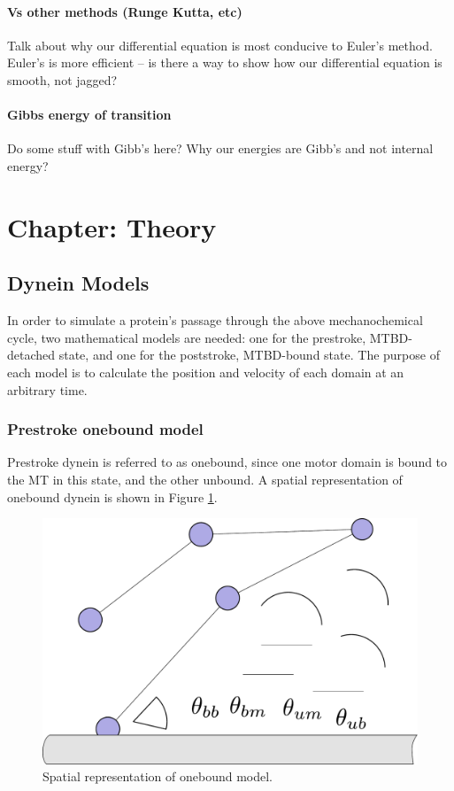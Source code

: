 \documentclass[10pt]{article} %
\begin{document}
\paragraph{Vs other methods (Runge Kutta, etc)}
Talk about why our differential equation is most conducive to Euler's method. Euler's is more
efficient -- is there a way to show how our differential equation is smooth, not jagged?

\paragraph{Gibbs energy of transition}
Do some stuff with Gibb's here? Why our energies are Gibb's and not internal energy?\\

\section{Chapter: Theory}
\subsection{Dynein Models}
In order to simulate a protein's passage through the above mechanochemical cycle, two mathematical models are needed: one for the prestroke, MTBD-detached state, and one for the poststroke, MTBD-bound state. The purpose of each model is to calculate the position and velocity of each domain at an arbitrary time.\\

\subsubsection{Prestroke onebound model}
Prestroke dynein is referred to as onebound, since one motor domain is bound to the MT in this state, and the other unbound. A spatial representation of onebound dynein is shown in Figure \ref{ob_fig}. 

\begin{figure}[h]
  \centering
  \includegraphics[width=.45\textwidth]{../../figures/ob_fig.pdf}
  \caption{Spatial representation of onebound model.}
  \label{ob_fig}
\end{figure}
\end{document}

